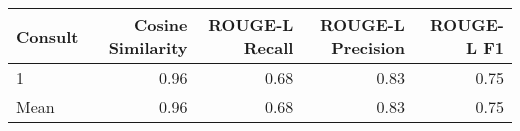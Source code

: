 \begin{tabular}{lrrrr}
\toprule
Consult & Cosine Similarity & ROUGE-L Recall & ROUGE-L Precision & ROUGE-L F1 \\
\midrule
1 & 0.96 & 0.68 & 0.83 & 0.75 \\
Mean & 0.96 & 0.68 & 0.83 & 0.75 \\
\bottomrule
\end{tabular}
